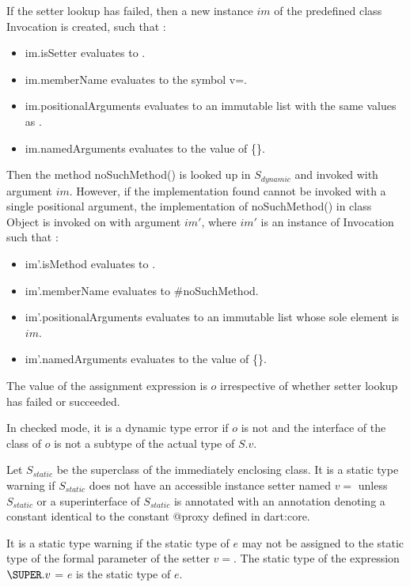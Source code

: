 \documentclass{article}
\newcommand{\code}[1]{{\sf #1}}
\begin{document}
\LMHash{}
If the setter lookup has failed, then a new instance $im$  of the predefined class  \code{Invocation}  is created, such that :
\begin{itemize}
\item  \code{im.isSetter} evaluates to \code{\TRUE{}}.
\item  \code{im.memberName} evaluates to the symbol \code{v=}.
\item \code{im.positionalArguments} evaluates to an immutable list with the same values as \code{[$o$]}.
\item \code{im.namedArguments} evaluates to the value of \code{\CONST{} \{\}}.
\end{itemize}

\LMHash{}
Then the method \code{noSuchMethod()} is looked up in $S_{dynamic}$ and invoked  with argument $im$. 
However, if the implementation found cannot be invoked with a single positional argument, the implementation  of \code{noSuchMethod()} in class \code{Object} is invoked on \THIS{} with argument $im'$, where $im'$ is an instance of \code{Invocation} such that :
\begin{itemize}
\item  \code{im'.isMethod} evaluates to \code{\TRUE{}}.
\item  \code{im'.memberName} evaluates to \code{\#noSuchMethod}.
\item \code{im'.positionalArguments} evaluates to an immutable list whose sole element is  $im$.
\item \code{im'.namedArguments} evaluates to the value of \code{\CONST{} \{\}}.
\end{itemize}

\LMHash{}
The value of the assignment expression is $o$ irrespective of whether setter lookup has failed or succeeded.

\LMHash{}
In checked mode, it is a dynamic type error if $o$ is not \NULL{} and the interface of the class of $o$ is not a subtype of the actual type of $S.v$.

\LMHash{}
Let $S_{static}$ be the superclass of the immediately enclosing class. It is a static type warning if $S_{static}$ does not have an accessible instance setter named $v=$ unless $S_{static}$ or a superinterface of $S_{static}$ is annotated with an annotation denoting a constant identical to the constant \code{@proxy} defined in \code{dart:core}. 

\LMHash{}
It is a static type warning if the static type of $e$ may not be assigned to the static type of the formal parameter of the setter $v=$.   The static type of the expression $\SUPER.v$ \code{=} $e$ is the static type of $e$.
\end{document}
